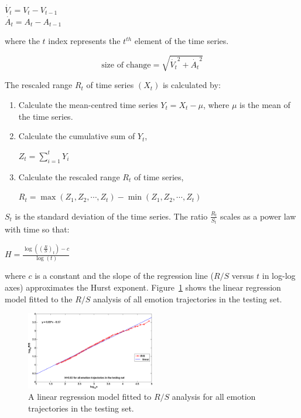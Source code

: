 \documentclass[10pt,journal,cspaper,compsoc]{IEEEtran}
\begin{document}
\begin{center}
$\dot{V_{t}}= V_{t}-V_{t-1} $  \\
$\dot{A_{t}}= A_{t}-A_{t-1} $ \\
\end{center}

\noindent where the $t$ index represents the $t^{th}$ element of the time series.

\begin{equation}
\label{eq_size_of_change}
\text{size of change}=\sqrt{\dot{V_{t}}^{2}+\dot{A_{t}}^{2}}
\end{equation}

\noindent The rescaled range $R_{t}$ of time series $(X_{t})$ is calculated by:

\begin{enumerate}
\item Calculate the mean-centred time series $Y_{t}=X_{t}-\mu$, where $\mu$ is the mean of the time series.
\item Calculate the cumulative sum of $Y_{t}$,
\begin{center}
$Z_{t}=\sum \limits_{i=1}^t Y_{i}$
\end{center}
\item Calculate the rescaled range $R_{t}$ of time series,
\begin{center}
$R_{t}=\max(Z_{1}, Z_{2}, \cdots, Z_{t}) - \min(Z_{1}, Z_{2}, \cdots, Z_{t})$
\end{center}
\end{enumerate}

\noindent $S_{t}$ is the standard deviation of the time series. The ratio $\frac{R_{t}}{S_{t}}$ scales as a power law with time so that:
\begin{center}
$H=\frac{\log \left( \left( \frac{R}{S} \right) _{t} \right) - c}{\log(t)}$
\end{center}
\noindent where $c$ is a constant and the slope of the regression line ($R/S$ versus $t$ in log-log axes) approximates the Hurst exponent. Figure~\ref{fig_hurst_slope} shows the linear regression model fitted to the $R/S$ analysis of all emotion trajectories in the testing set.

\begin{figure}[!htp]
\centering
\includegraphics[width=0.5\textwidth]{figures/Ch7/hurst_slope.png}
\caption{A linear regression model fitted to $R/S$ analysis for all emotion trajectories in the testing set.}
\label{fig_hurst_slope}
\end{figure}
\end{document}
